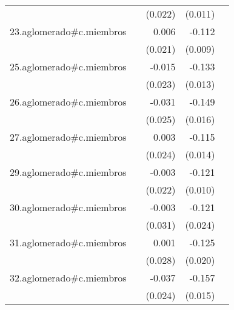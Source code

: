 {\begin{longtable}{l*{4}{D{.}{.}{-1}}}
            &                     &     (0.022)         &     (0.011)         &                     \\
\addlinespace
23.aglomerado#c.miembros&                     &       0.006         &      -0.112\sym{***}&                     \\
            &                     &     (0.021)         &     (0.009)         &                     \\
\addlinespace
25.aglomerado#c.miembros&                     &      -0.015         &      -0.133\sym{***}&                     \\
            &                     &     (0.023)         &     (0.013)         &                     \\
\addlinespace
26.aglomerado#c.miembros&                     &      -0.031         &      -0.149\sym{***}&                     \\
            &                     &     (0.025)         &     (0.016)         &                     \\
\addlinespace
27.aglomerado#c.miembros&                     &       0.003         &      -0.115\sym{***}&                     \\
            &                     &     (0.024)         &     (0.014)         &                     \\
\addlinespace
29.aglomerado#c.miembros&                     &      -0.003         &      -0.121\sym{***}&                     \\
            &                     &     (0.022)         &     (0.010)         &                     \\
\addlinespace
30.aglomerado#c.miembros&                     &      -0.003         &      -0.121\sym{***}&                     \\
            &                     &     (0.031)         &     (0.024)         &                     \\
\addlinespace
31.aglomerado#c.miembros&                     &       0.001         &      -0.125\sym{***}&                     \\
            &                     &     (0.028)         &     (0.020)         &                     \\
\addlinespace
32.aglomerado#c.miembros&                     &      -0.037         &      -0.157\sym{***}&                     \\
            &                     &     (0.024)         &     (0.015)         &                     \\

\end{longtable}}
